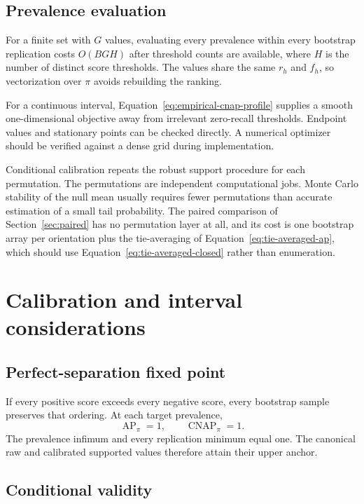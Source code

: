 \documentclass[11pt]{article}
\newcommand{\AP}{\operatorname{AP}}
\newcommand{\CNAP}{\operatorname{CNAP}}
\theoremstyle{remark}
\begin{document}
\subsection{Prevalence evaluation}

For a finite set with $G$ values, evaluating every prevalence within every bootstrap replication costs $O(BGH)$ after threshold counts are available, where $H$ is the number of distinct score thresholds. The values share the same $r_h$ and $f_h$, so vectorization over $\pi$ avoids rebuilding the ranking.

For a continuous interval, Equation~\eqref{eq:empirical-cnap-profile} supplies a smooth one-dimensional objective away from irrelevant zero-recall thresholds. Endpoint values and stationary points can be checked directly. A numerical optimizer should be verified against a dense grid during implementation.

Conditional calibration repeats the robust support procedure for each permutation. The permutations are independent computational jobs. Monte Carlo stability of the null mean usually requires fewer permutations than accurate estimation of a small tail probability. The paired comparison of Section~\ref{sec:paired} has no permutation layer at all, and its cost is one bootstrap array per orientation plus the tie-averaging of Equation~\eqref{eq:tie-averaged-ap}, which should use Equation~\eqref{eq:tie-averaged-closed} rather than enumeration.

\section{Calibration and interval considerations}
\label{app:calibration}

\subsection{Perfect-separation fixed point}

If every positive score exceeds every negative score, every bootstrap sample preserves that ordering. At each target prevalence,
\[
\AP_\pi=1,
\qquad
\CNAP_\pi=1.
\]
The prevalence infimum and every replication minimum equal one. The canonical raw and calibrated supported values therefore attain their upper anchor.

\subsection{Conditional validity}
\end{document}
